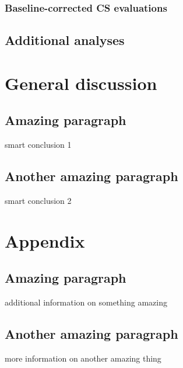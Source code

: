 \documentclass[
  man,floatsintext]{apa6}
\begin{document}
\hypertarget{baseline-corrected-cs-evaluations}{%
\subsubsection{Baseline-corrected CS evaluations}\label{baseline-corrected-cs-evaluations}}

\hypertarget{additional-analyses}{%
\subsection{Additional analyses}\label{additional-analyses}}

\hypertarget{general-discussion}{%
\section{General discussion}\label{general-discussion}}

\hypertarget{amazing-paragraph}{%
\subsection{Amazing paragraph}\label{amazing-paragraph}}

smart conclusion 1

\hypertarget{another-amazing-paragraph}{%
\subsection{Another amazing paragraph}\label{another-amazing-paragraph}}

smart conclusion 2

\hypertarget{appendix}{%
\section{Appendix}\label{appendix}}

\hypertarget{appendix-appendix}{%
\appendix}


\hypertarget{amazing-paragraph-1}{%
\subsection{Amazing paragraph}\label{amazing-paragraph-1}}

additional information on something amazing

\hypertarget{another-amazing-paragraph-1}{%
\subsection{Another amazing paragraph}\label{another-amazing-paragraph-1}}

more information on another amazing thing
\end{document}
